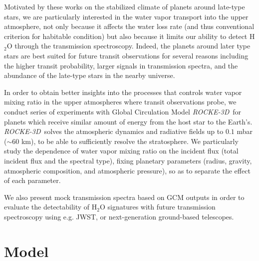 \documentclass[11pt,numberedappendix,twocolappendix,]{emulateapj}
\def\water{H$_2$O }
\def\modelE{{\it ROCKE-3D}}
\def\memo#1{\color{red}$[${\bf #1}$]$ \color{black}}
\begin{document}
Motivated by these works on the stabilized climate of planets around late-type stars, we are particularly interested in the water vapor transport  into the upper atmosphere, not only because it affects the water loss rate (and thus conventional criterion for habitable condition) but also because it limits our ability to detect \water through the transmission spectroscopy. 
%
Indeed, the planets around later type stars are best suited for future transit observations for several reasons including the higher transit probability, larger signals in transmission spectra, and the abundance of the late-type stars in the nearby universe. 


In order to obtain better insights into the processes that controls water vapor mixing ratio in the upper atmospheres where transit observations probe, we conduct series of experiments with Global Circulation Model \modelE \ for planets which receive similar amount of energy from the host star to the Earth's. 
\modelE \ solves the atmospheric dynamics and radiative fields up to $0.1$ mbar ($\sim $60 km), to be able to sufficiently resolve the stratosphere. 
We particularly study the dependence of water vapor mixing ratio on the incident flux (total incident flux and the spectral type), fixing planetary parameters (radius, gravity, atmospheric composition, and atmospheric pressure), so as to separate the effect of each parameter. 

We also present mock transmission spectra based on GCM outputs in order to evaluate the detectability of \water signatures with future transmission spectroscopy using e.g. JWST, or next-generation ground-based telescopes. 




\section{Model}
\label{s:model}
\end{document}
